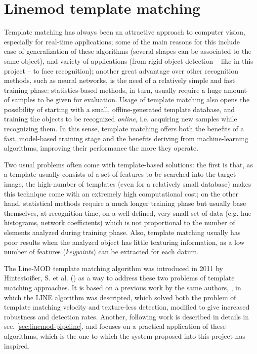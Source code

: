 \section{Linemod template matching} \label{sec:linemod}
Template matching has always been an attractive approach to computer vision,
especially for real-time applications; some of the main reasons for this
include ease of generalization of
these algorithms (several shapes can be associated to the same object), and
variety of applications (from rigid object detection -- like in this project --
to face recognition); another great advantage over other recognition methods,
such as neural networks, is the need of a relatively simple and fast training phase:
statistics-based methods, in turn, usually require a huge amount 
of samples to be given for evaluation. Usage of template matching also opens
the possibility of starting with a small, offline-generated template database, and training the
objects to be recognized \emph{online}, i.e. acquiring new samples while
recognizing them. In this sense, template matching offers both the benefits of
a fast, model-based training stage and the benefits deriving from
machine-learning algorithms, improving their performance the more they operate.

Two usual problems often come with template-based solutions: the first is that,
as a template usually consists of a set of features to be searched into the
target image, the high-number of templates (even for a relatively small
database) makes this technique come with an extremely high computational cost;
on the other hand, statistical methods require a much longer training phase but
usually base themselves, at recognition time, on a well-defined, very small set of
data (e.g. hue histograms, network coefficients) which is not proportional to the number of elements
analyzed during training phase. Also, template matching usually has poor
results when the analyzed object has little texturing information, as a low
number of features (\emph{keypoints}) can be extracted for each datum.

The Line-MOD template matching algorithm was introduced in 2011 by
Hintestoi{\ss}er, S. et al. (\cite{linemod-paper}) as a way to address these
two problems of template matching approaches. It is based on a previous work by
the same authors, \cite{linemod-origins}, in which the LINE algorithm was
descripted, which solved both the problem of template matching velocity and
texture-less detection, modified to give increased robustness and detection
rates. Another, following work is described in details in sec.
\ref{sec:linemod-pipeline}, and focuses on a practical application of these
algorithms, which is the one to which the system proposed into this project has
inspired.

